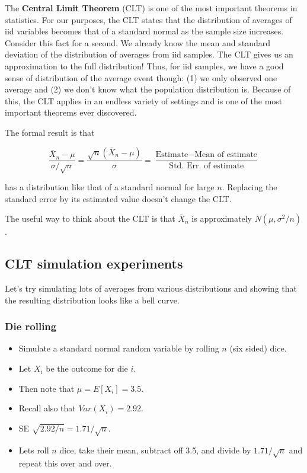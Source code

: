 \documentclass[]{article}
\begin{document}
The \textbf{Central Limit Theorem} (CLT) is one of the most important
theorems in statistics. For our purposes, the CLT states that the
distribution of averages of iid variables becomes that of a standard
normal as the sample size increases. Consider this fact for a second. We
already know the mean and standard deviation of the distribution of
averages from iid samples. The CLT gives us an approximation to the full
distribution! Thus, for iid samples, we have a good sense of
distribution of the average event though: (1) we only observed one
average and (2) we don't know what the population distribution is.
Because of this, the CLT applies in an endless variety of settings and
is one of the most important theorems ever discovered.

The formal result is that

\[
\frac{\bar X_n - \mu}{\sigma / \sqrt{n}}=
\frac{\sqrt n (\bar X_n - \mu)}{\sigma}
= \frac{\mbox{Estimate} - \mbox{Mean of estimate}}{\mbox{Std. Err. of estimate}}
\]

has a distribution like that of a standard normal for large $n$.
Replacing the standard error by its estimated value doesn't change the
CLT.

The useful way to think about the CLT is that $\bar X_n$ is
approximately $N(\mu, \sigma^2 / n)$.

\subsection{CLT simulation
experiments}\label{clt-simulation-experiments}

Let's try simulating lots of averages from various distributions and
showing that the resulting distribution looks like a bell curve.

\subsubsection{Die rolling}\label{die-rolling}

\begin{itemize}
\itemsep1pt\parskip0pt
\item
  Simulate a standard normal random variable by rolling $n$ (six sided)
  dice.
\item
  Let $X_i$ be the outcome for die $i$.
\item
  Then note that $\mu = E[X_i] = 3.5$.
\item
  Recall also that $Var(X_i) = 2.92$.
\item
  SE $\sqrt{2.92 / n} = 1.71 / \sqrt{n}$.
\item
  Lets roll $n$ dice, take their mean, subtract off 3.5, and divide by
  $1.71 / \sqrt{n}$ and repeat this over and over.
\end{itemize}
\end{document}
